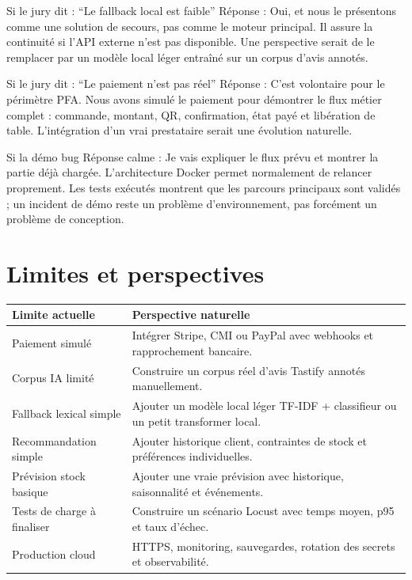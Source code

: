 \documentclass[10pt,a4paper]{article}
\begin{document}
\begin{riskbox}{Si le jury dit : ``Le fallback local est faible''}
Réponse : Oui, et nous le présentons comme une solution de secours, pas comme le moteur principal. Il assure la continuité si l'API externe n'est pas disponible. Une perspective serait de le remplacer par un modèle local léger entraîné sur un corpus d'avis annotés.
\end{riskbox}

\begin{riskbox}{Si le jury dit : ``Le paiement n'est pas réel''}
Réponse : C'est volontaire pour le périmètre PFA. Nous avons simulé le paiement pour démontrer le flux métier complet : commande, montant, QR, confirmation, état payé et libération de table. L'intégration d'un vrai prestataire serait une évolution naturelle.
\end{riskbox}

\begin{riskbox}{Si la démo bug}
Réponse calme : Je vais expliquer le flux prévu et montrer la partie déjà chargée. L'architecture Docker permet normalement de relancer proprement. Les tests exécutés montrent que les parcours principaux sont validés ; un incident de démo reste un problème d'environnement, pas forcément un problème de conception.
\end{riskbox}

\section{Limites et perspectives}

\begin{tabularx}{\textwidth}{p{4.2cm}Y}
\toprule
\textbf{Limite actuelle} & \textbf{Perspective naturelle} \\
\midrule
Paiement simulé & Intégrer Stripe, CMI ou PayPal avec webhooks et rapprochement bancaire. \\
Corpus IA limité & Construire un corpus réel d'avis Tastify annotés manuellement. \\
Fallback lexical simple & Ajouter un modèle local léger TF-IDF + classifieur ou un petit transformer local. \\
Recommandation simple & Ajouter historique client, contraintes de stock et préférences individuelles. \\
Prévision stock basique & Ajouter une vraie prévision avec historique, saisonnalité et événements. \\
Tests de charge à finaliser & Construire un scénario Locust avec temps moyen, p95 et taux d'échec. \\
Production cloud & HTTPS, monitoring, sauvegardes, rotation des secrets et observabilité. \\
\bottomrule
\end{tabularx}
\end{document}
